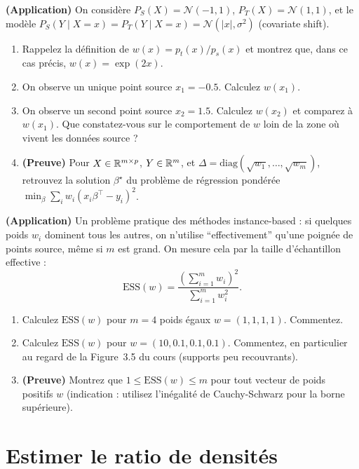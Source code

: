 \documentclass[11pt]{article}
\begin{document}
\begin{exercise} \textbf{(Application)}
\label{ex:td-weighted-reg}
On considère $P_S(X) = \mathcal N(-1,1)$, $P_T(X) = \mathcal N(1, 1)$, et le modèle
$P_S(Y\mid X=x) = P_T(Y\mid X=x) = \mathcal N(|x|, \sigma^2)$ (covariate shift).
\begin{enumerate}[label=(\alph*)]
\item Rappelez la définition de $w(x) = p_t(x)/p_s(x)$ et montrez que, dans ce cas précis,
$w(x) = \exp(2x)$.
\item On observe un unique point source $x_1 = -0.5$. Calculez $w(x_1)$.
\item On observe un second point source $x_2 = 1.5$. Calculez $w(x_2)$ et comparez à $w(x_1)$. Que
constatez-vous sur le comportement de $w$ loin de la zone où vivent les données source ?
\item \textbf{(Preuve)} Pour $X\in\mathbb{R}^{m\times p}$, $Y\in\mathbb{R}^m$, et $\Delta=\mathrm{diag}(\sqrt{w_1},
\ldots,\sqrt{w_m})$, retrouvez la solution $\beta^\star$ du problème de régression pondérée
$\min_\beta \sum_i w_i(x_i\beta^\top - y_i)^2$.
\end{enumerate}
\end{exercise}

\begin{exercise} \textbf{(Application)}
\label{ex:ess}
Un problème pratique des méthodes instance-based : si quelques poids $w_i$ dominent tous les autres, on
n'utilise \enquote{effectivement} qu'une poignée de points source, même si $m$ est grand. On mesure cela
par la taille d'échantillon effective :
\[
\mathrm{ESS}(w) = \frac{\left(\sum_{i=1}^m w_i\right)^2}{\sum_{i=1}^m w_i^2}.
\]
\begin{enumerate}[label=(\alph*)]
\item Calculez $\mathrm{ESS}(w)$ pour $m=4$ poids égaux $w=(1,1,1,1)$. Commentez.
\item Calculez $\mathrm{ESS}(w)$ pour $w=(10, 0.1, 0.1, 0.1)$. Commentez, en particulier au regard de la
Figure~3.5 du cours (supports peu recouvrants).
\item \textbf{(Preuve)} Montrez que $1 \le \mathrm{ESS}(w) \le m$ pour tout vecteur de poids positifs
$w$ (indication : utilisez l'inégalité de Cauchy-Schwarz pour la borne supérieure).
\end{enumerate}
\end{exercise}

\section{Estimer le ratio de densités}
\end{document}
